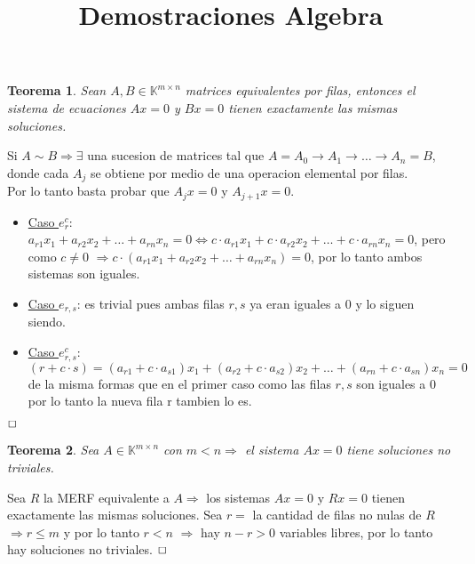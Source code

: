 \documentclass[]{article}
\newtheorem{theorem}{Teorema}
\newenvironment{proof}{\noindent{\bf Prueba:}}{$\hfill \Box$ \vspace{10pt}}
\begin{document}
\newcommand{\W}[1]{\text{$W_{#1}$}}
\newcommand{\mtx}[2]{\mathbb{K}^{#1 \times #2}}
\newcommand{\espvec}{\text{ $\mathbb{K}-$espacio vectorial }}
\newcommand{\espgen}[1]{\langle #1 \rangle}
\newcommand{\incluye}[2]{#1 \subseteq #2}
\newcommand{\conjunto}[1]{\text{$\{ {#1} \}$}}
\newcommand{\li}{L.I.}

\title{Demostraciones Algebra}
\maketitle

\begin{theorem}
    Sean $A,B \in \mtx{m}{n}$  matrices equivalentes por filas, entonces el sistema
    de ecuaciones $Ax=0$ y $Bx=0$ tienen exactamente las mismas soluciones. 
\end{theorem}
\begin{proof}
    Si $A \sim B \Longrightarrow \exists$ una sucesion de matrices tal que
    $A=A_0 \rightarrow A_1 \rightarrow \dots \rightarrow A_n=B$, donde cada $A_j$ se obtiene por
    medio de una operacion elemental por filas.\\
    Por lo tanto basta probar que $A_jx=0$ y $A_{j+1}x=0$.
    \begin{itemize}
        \item \underline{Caso $e_r^c$}: $a_{r1}x_1+a_{r2}x_2+ \dots +a_{rn}x_n = 0 \iff
        c \cdot a_{r1}x_1+c \cdot a_{r2}x_2+ \dots +c \cdot a_{rn}x_n = 0$, pero como $c \neq 0$
        $\Longrightarrow c \cdot (a_{r1}x_1+a_{r2}x_2+ \dots +a_{rn}x_n) = 0$, por lo tanto 
        ambos sistemas son iguales.
        \item \underline{Caso $e_{r,s}$}: es trivial pues ambas filas $r,s$ ya eran iguales a 0
        y lo siguen siendo.
        \item \underline{Caso $e_{r,s}^c$}: $(r + c \cdot s) = (a_{r1}+c\cdot a_{s1})x_1+
        (a_{r2}+c\cdot a_{s2})x_2+ \dots +(a_{rn}+c\cdot a_{sn})x_n = 0$ de la misma formas que en
        el primer caso como las filas $r,s$ son iguales a 0 por lo tanto la nueva fila r tambien lo es.
    \end{itemize}
\end{proof}

\begin{theorem}
    Sea $A \in \mtx{m}{n}$ con $m<n \Longrightarrow$ el sistema $Ax=0$
    tiene soluciones no triviales.
\end{theorem}
\begin{proof}
    Sea $R$ la MERF equivalente a $A \Longrightarrow$ los sistemas $Ax=0$ y $Rx=0$ tienen
    exactamente las mismas soluciones. Sea $r=$ la cantidad de filas no nulas de $R$
    $\Longrightarrow r \leq m$ y por lo tanto $r < n$ $\Longrightarrow$ hay $n-r>0$
    variables libres, por lo tanto hay soluciones no triviales.
\end{proof}
\end{document}
